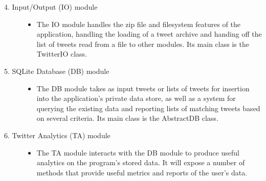\documentclass{article}
\begin{document}
\begin{description}
\begin{itemize}
\end{itemize}

\item[4. Input/Output (IO) module] \hfill
\begin{itemize}
\item The IO module handles the zip file and filesystem features of the application, handling the loading of a tweet archive and handing off the list of tweets read from a file to other modules. Its main class is the TwitterIO class.
\end{itemize}

\item[5. SQLite Database (DB) module] \hfill
\begin{itemize}
\item The DB module takes as input tweets or lists of tweets for insertion into the application's private data store, as well as a system for querying the existing data and reporting lists of matching tweets based on several criteria. Its main class is the AbstractDB class.
\end{itemize}

\item[6. Twitter Analytics (TA) module] \hfill
\begin{itemize}
\item The TA module interacts with the DB module to produce useful analytics on the program's stored data. It will expose a number of methods that provide useful metrics and reports of the user's data.
\end{itemize}
\end{description}
\end{document}
